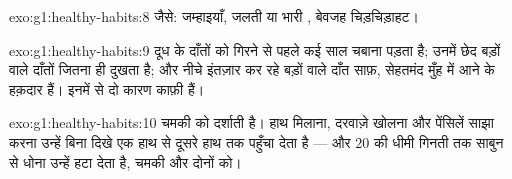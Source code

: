 \begin{solution}{exo:g1:healthy-habits:8}
जैसे: जम्हाइयाँ, जलती या भारी , बेवजह चिड़चिड़ाहट।
\end{solution}

\begin{solution}{exo:g1:healthy-habits:9}
दूध के दाँतों को गिरने से पहले कई साल चबाना पड़ता है; उनमें छेद बड़ों
वाले दाँतों जितना ही दुखता है; और नीचे इंतज़ार कर रहे बड़ों वाले दाँत
साफ़, सेहतमंद मुँह में आने के हक़दार हैं। इनमें से दो कारण काफ़ी हैं।
\end{solution}

\begin{solution}{exo:g1:healthy-habits:10}
चमकी  को दर्शाती है। हाथ मिलाना, दरवाज़े खोलना और पेंसिलें
साझा करना उन्हें बिना दिखे एक हाथ से दूसरे हाथ तक पहुँचा देता है ---
और $20$ की धीमी गिनती तक साबुन से धोना उन्हें हटा देता है, चमकी और
 दोनों को।
\end{solution}
